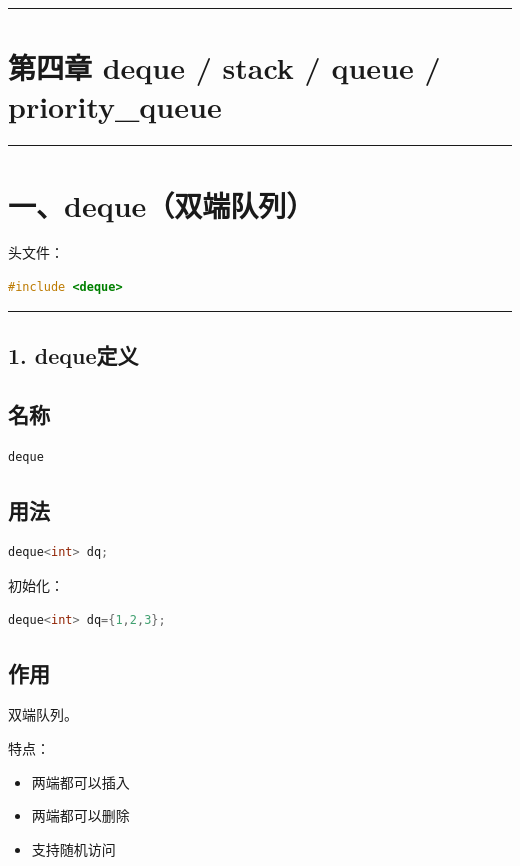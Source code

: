 \documentclass[9pt,twocolumn]{extarticle}
\begin{document}
\noindent\rule{\linewidth}{0.4pt}

\section{第四章 deque / stack / queue / priority\_queue}

\noindent\rule{\linewidth}{0.4pt}

\section{一、deque（双端队列）}

头文件：
\begin{lstlisting}[language=C++]
#include <deque>
\end{lstlisting}

\noindent\rule{\linewidth}{0.4pt}

\subsection{1. deque定义}

\subsection{名称}
\begin{lstlisting}[language=C++]
deque
\end{lstlisting}

\subsection{用法}
\begin{lstlisting}[language=C++]
deque<int> dq;
\end{lstlisting}
初始化：
\begin{lstlisting}[language=C++]
deque<int> dq={1,2,3};
\end{lstlisting}

\subsection{作用}
双端队列。

特点：
\begin{itemize}
    \item 两端都可以插入
    \item 两端都可以删除
    \item 支持随机访问
\end{itemize}
\end{document}
